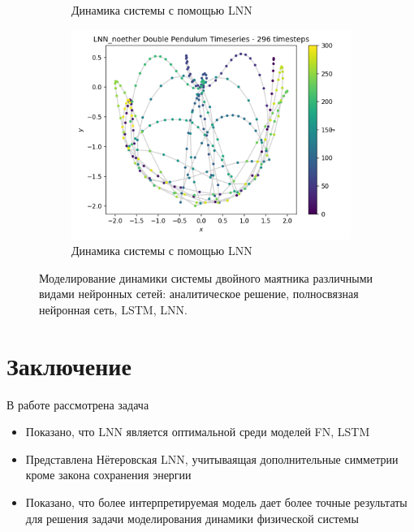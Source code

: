 \documentclass[12pt]{article}
\begin{document}
\begin{figure}[H]
\begin{subfigure}[b]{0.49\textwidth}
			\caption{Динамика системы с помощью LNN}
			\label{fig:five over x}
		\end{subfigure}
	\begin{subfigure}[b]{0.49\textwidth}
		\centering
		\includegraphics[width=\textwidth]{predicted_trajectory_LNN_noether.png}
		\caption{Динамика системы с помощью LNN}
		\label{fig:five over x}
	\end{subfigure}
		\caption{Моделирование динамики системы двойного маятника различными видами нейронных сетей: аналитическое решение, полносвязная нейронная сеть, LSTM, LNN.}
		\label{fig:three graphs}
	\end{figure}
	
	
	\section{Заключение}
	В работе рассмотрена задача 
	\begin{itemize}
		\item Показано, что LNN является оптимальной среди моделей FN, LSTM
		\item Представлена Нётеровская LNN, учитываящая дополнительные симметрии кроме закона сохранения энергии
		\item Показано, что более интерпретируемая модель дает более точные результаты для решения задачи моделирования динамики физической системы
	\end{itemize}
	
	

		
	
	
\end{document}
